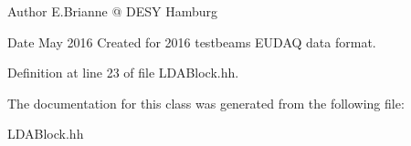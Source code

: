 \begin{DoxyAuthor}{Author}
E.\-Brianne @ D\-E\-S\-Y Hamburg 
\end{DoxyAuthor}
\begin{DoxyDate}{Date}
May 2016 Created for 2016 testbeams E\-U\-D\-A\-Q data format. 
\end{DoxyDate}


Definition at line 23 of file L\-D\-A\-Block.\-hh.



The documentation for this class was generated from the following file\-:\begin{DoxyCompactItemize}
\item 
L\-D\-A\-Block.\-hh\end{DoxyCompactItemize}
